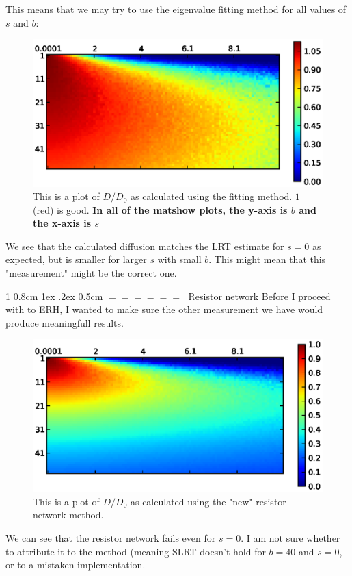 \documentclass[onecolumn,fleqn,notitlepage,secnumarabic]{revtex4}
\makeatletter
\def\section{%
  \@startsection
    {section}%
    {1}%
    {\z@}%
    {0.8cm \@plus1ex \@minus .2ex}%
    {0.5cm}%
    {\Large\bf $=\!=\!=\!=\!=\!=\;$}%
}%
\makeatother
\begin{document}
This means that we may try to use the eigenvalue fitting method for all values of $s$ and $b$:
\begin{figure}[H]
\includegraphics{fit}
\caption{This is a plot of $D/D_0$ as calculated using the fitting method. $1$ (red) is good. \bf{ In all of the matshow plots, the y-axis is $b$ and the x-axis is $s$}}
\end{figure} 
We see that the calculated diffusion matches the LRT estimate for $s=0$ as expected, but is smaller for larger $s$ with small $b$.
This might mean that this "measurement" might be the correct one.

\section{Resistor network}
Before I proceed with to ERH, I wanted to make sure the other measurement we have would produce meaningfull results.
\begin{figure}[H]
\includegraphics{new_resnet}
\caption{This is a plot of $D/D_0$ as calculated using the "new" resistor network method.}
\end{figure} 
We can see that the resistor network fails even for $s=0$. I am not sure whether to attribute it to the method (meaning SLRT doesn't hold for $b=40$ and $s=0$, or to 
a mistaken implementation.
\end{document}
